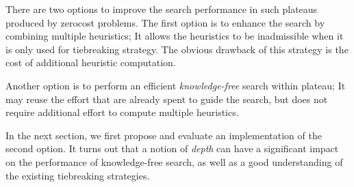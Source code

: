 There are two options to improve the search performance in such plateaus
produced by zerocost problems. The first option is to enhance the search
by combining multiple heuristics; It allows the heuristics to be
inadmissible when it is only used for tiebreaking strategy. The obvious
drawback of this strategy is the cost of additional heuristic
computation.

Another option is to perform an efficient
\emph{knowledge-free} search within plateau; It may reuse the effort
that are already spent to guide the search, but does not require
additional effort to compute multiple heuristics.

In the next section, we first propose and evaluate an implementation of
the second option.  It turns out that a notion of \emph{depth} can have
a significant impact on the performance of knowledge-free search, as
well as a good understanding of the existing tiebreaking strategies.

